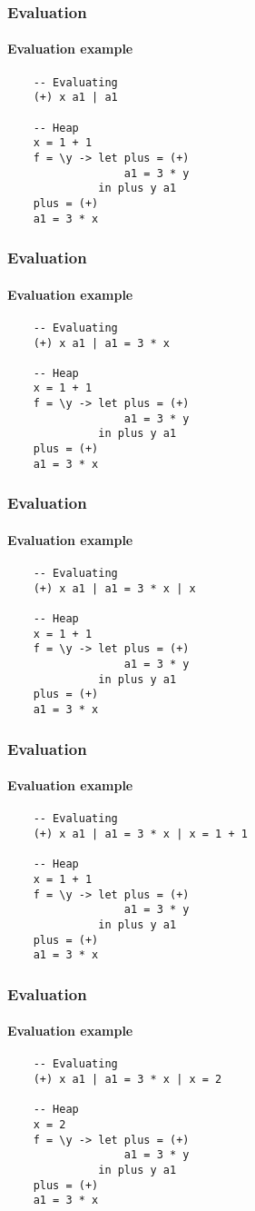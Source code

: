 \documentclass{beamer}
\begin{document}
\begin{frame}[fragile]
\frametitle{Evaluation}
\framesubtitle{Evaluation example}

\begin{verbatim}
    -- Evaluating
    (+) x a1 | a1

    -- Heap
    x = 1 + 1
    f = \y -> let plus = (+)
                  a1 = 3 * y
              in plus y a1
    plus = (+)
    a1 = 3 * x
\end{verbatim}
\end{frame}

\begin{frame}[fragile]
\frametitle{Evaluation}
\framesubtitle{Evaluation example}

\begin{verbatim}
    -- Evaluating
    (+) x a1 | a1 = 3 * x

    -- Heap
    x = 1 + 1
    f = \y -> let plus = (+)
                  a1 = 3 * y
              in plus y a1
    plus = (+)
    a1 = 3 * x
\end{verbatim}
\end{frame}

\begin{frame}[fragile]
\frametitle{Evaluation}
\framesubtitle{Evaluation example}

\begin{verbatim}
    -- Evaluating
    (+) x a1 | a1 = 3 * x | x

    -- Heap
    x = 1 + 1
    f = \y -> let plus = (+)
                  a1 = 3 * y
              in plus y a1
    plus = (+)
    a1 = 3 * x
\end{verbatim}
\end{frame}

\begin{frame}[fragile]
\frametitle{Evaluation}
\framesubtitle{Evaluation example}

\begin{verbatim}
    -- Evaluating
    (+) x a1 | a1 = 3 * x | x = 1 + 1

    -- Heap
    x = 1 + 1
    f = \y -> let plus = (+)
                  a1 = 3 * y
              in plus y a1
    plus = (+)
    a1 = 3 * x
\end{verbatim}
\end{frame}

\begin{frame}[fragile]
\frametitle{Evaluation}
\framesubtitle{Evaluation example}

\begin{verbatim}
    -- Evaluating
    (+) x a1 | a1 = 3 * x | x = 2

    -- Heap
    x = 2
    f = \y -> let plus = (+)
                  a1 = 3 * y
              in plus y a1
    plus = (+)
    a1 = 3 * x
\end{verbatim}
\end{frame}
\end{document}
